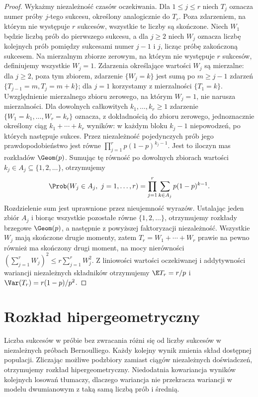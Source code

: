 \begin{proof}
Wykażmy niezależność czasów oczekiwania.
Dla $1\leq j\leq r$ niech $T_j$ oznacza numer próby
$j$-tego sukcesu, określony analogicznie do $T_r$.
Poza zdarzeniem, na którym nie występuje $r$ sukcesów,
wszystkie te liczby są skończone.
Niech $W_1$ będzie liczbą prób do pierwszego sukcesu,
a dla $j\geq2$ niech $W_j$ oznacza liczbę kolejnych prób
pomiędzy sukcesami numer $j-1$ i $j$, licząc próbę
zakończoną sukcesem. Na mierzalnym zbiorze zerowym,
na którym nie występuje $r$ sukcesów, definiujemy wszystkie
$W_j=1$. Zdarzenia określające wartości $W_j$ są mierzalne:
dla $j\geq2$, poza tym zbiorem, zdarzenie $\{W_j=k\}$
jest sumą po $m\geq j-1$ zdarzeń
$\{T_{j-1}=m,T_j=m+k\}$; dla $j=1$ korzystamy
z mierzalności $\{T_1=k\}$. Uwzględnienie mierzalnego
zbioru zerowego, na którym $W_j=1$, nie narusza mierzalności.
Dla dowolnych całkowitych $k_1,\ldots,k_r\geq1$
zdarzenie $\{W_1=k_1,\ldots,W_r=k_r\}$ oznacza, z dokładnością do zbioru zerowego,
jednoznacznie określony ciąg
$k_1+\cdots+k_r$ wyników: w każdym bloku $k_j-1$
niepowodzeń, po których następuje sukces.
Przez niezależność pojedynczych prób jego
prawdopodobieństwo jest równe
$\prod_{j=1}^r p(1-p)^{k_j-1}$.
Jest to iloczyn mas rozkładów $\Geom(p)$.
Sumując tę równość po dowolnych zbiorach wartości
$k_j\in A_j\subseteq\{1,2,\ldots\}$, otrzymujemy
\[
\Prob(W_j\in A_j,\ j=1,\ldots,r)
=\prod_{j=1}^r\sum_{k\in A_j}p(1-p)^{k-1}.
\]
Rozdzielenie sum jest uprawnione przez nieujemność wyrazów.
Ustalając jeden zbiór $A_j$ i biorąc wszystkie pozostałe
równe $\{1,2,\ldots\}$, otrzymujemy rozkłady brzegowe
$\Geom(p)$, a następnie z powyższej faktoryzacji
niezależność. Wszystkie $W_j$ mają skończone drugie
momenty, zatem $T_r=W_1+\cdots+W_r$ prawie na pewno
również ma skończony drugi moment, na mocy nierówności
$(\sum_{j=1}^r W_j)^2\leq r\sum_{j=1}^r W_j^2$.
Z liniowości wartości oczekiwanej i addytywności
wariancji niezależnych składników otrzymujemy
$\E T_r=r/p$ i $\Var(T_r)=r(1-p)/p^2$.
\end{proof}

\section{Rozkład hipergeometryczny}
Liczba sukcesów w próbie bez zwracania różni się od liczby
sukcesów w niezależnych próbach Bernoulliego. Każdy kolejny
wynik zmienia skład dostępnej populacji. Zliczając możliwe
podzbiory zamiast ciągów niezależnych doświadczeń, otrzymujemy
rozkład hipergeometryczny. Niedodatnia kowariancja wyników kolejnych
losowań tłumaczy, dlaczego wariancja nie przekracza wariancji
w modelu dwumianowym z taką samą liczbą prób i średnią.

